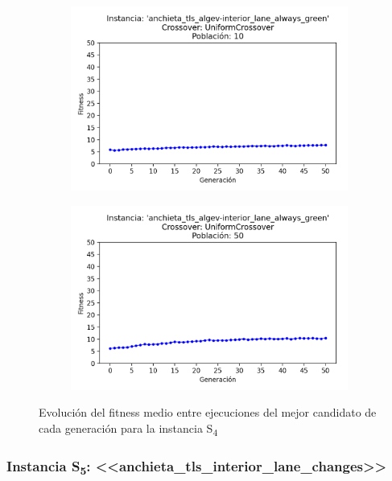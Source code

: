 \begin{figure}[h]
\begin{subfigure}[t]{.49\textwidth}
      \centering
      \includegraphics[width=\textwidth]{report/images/estudio/anchieta_tls_algev-interior_lane_always_green-UniformCrossover-10.png}
    \end{subfigure}
    \hfill
    \begin{subfigure}[t]{.49\textwidth}
      \centering
      \includegraphics[width=\textwidth]{report/images/estudio/anchieta_tls_algev-interior_lane_always_green-UniformCrossover-50.png}
    \end{subfigure}
    \caption{Evolución del fitness medio entre ejecuciones del mejor candidato de cada generación para la instancia S\textsubscript{4}}
    \label{fig:estudio:anchieta_tls_interior_lane_always_green}
\end{figure}

\subsubsection{Instancia S\textsubscript{5}: <<anchieta\_tls\_interior\_lane\_changes>>}


